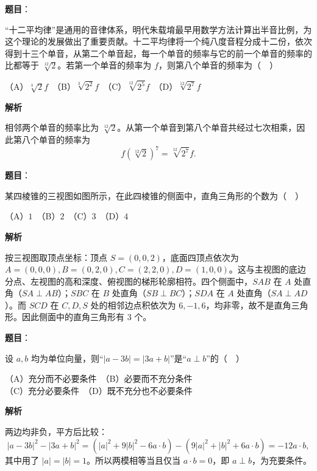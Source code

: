 \begin{answer}

\textbf{题目}：

“十二平均律”是通用的音律体系，明代朱载堉最早用数学方法计算出半音比例，为这个理论的发展做出了重要贡献。十二平均律将一个纯八度音程分成十二份，依次得到十三个单音，从第二个单音起，每一个单音的频率与它的前一个单音的频率的比都等于 $\sqrt[12]{2}$。若第一个单音的频率为 $f$，则第八个单音的频率为（　）

（A）$\sqrt[3]{2}f$　（B）$\sqrt[3]{2^2}f$　（C）$\sqrt[12]{2^5}f$　（D）$\sqrt[12]{2^7}f$

\textbf{解析}

相邻两个单音的频率比为 $\sqrt[12]{2}$。从第一个单音到第八个单音共经过七次相乘，因此第八个单音的频率为
\nopagebreak[4]
\[
f\left(\sqrt[12]{2}\right)^7=\sqrt[12]{2^7}f.
\]


\end{answer}
\begin{answer}

\textbf{题目}：

某四棱锥的三视图如图所示，在此四棱锥的侧面中，直角三角形的个数为（　）
\nopagebreak[4]
\begin{center}\end{center}
\nopagebreak[4]
（A）$1$　（B）$2$　（C）$3$　（D）$4$

\textbf{解析}

按三视图取顶点坐标：顶点 $S=(0,0,2)$，底面四顶点依次为 $A=(0,0,0),B=(0,2,0),C=(2,2,0),D=(1,0,0)$。这与主视图的底边分点、左视图的高和深度、俯视图的梯形轮廓相符。四个侧面中，$SAB$ 在 $A$ 处直角（$SA\perp AB$）；$SBC$ 在 $B$ 处直角（$SB\perp BC$）；$SDA$ 在 $A$ 处直角（$SA\perp AD$）。而 $SCD$ 在 $C,D,S$ 处的相邻边点积依次为 $6,-1,6$，均非零，故不是直角三角形。因此侧面中的直角三角形有 $3$ 个。


\end{answer}
\begin{answer}

\textbf{题目}：

设 $a,b$ 均为单位向量，则“$|a-3b|=|3a+b|$”是“$a\perp b$”的（　）

（A）充分而不必要条件　（B）必要而不充分条件\\
（C）充分必要条件　（D）既不充分也不必要条件

\textbf{解析}

两边均非负，平方后比较：
\nopagebreak[4]
\[
|a-3b|^2-|3a+b|^2
=(|a|^2+9|b|^2-6a\cdot b)-(9|a|^2+|b|^2+6a\cdot b)
=-12a\cdot b,
\]
其中用了 $|a|=|b|=1$。所以两模相等当且仅当 $a\cdot b=0$，即 $a\perp b$，为充要条件。


\end{answer}

